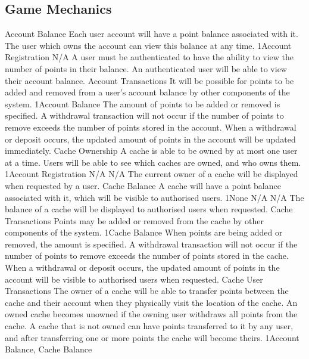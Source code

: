 	\subsection{Game Mechanics}
		\funcreq
			{Account Balance}
			{Each user account will have a point balance associated with it. 
			The user which owns the account can view this balance at any time.}
			{1}{Account Registration}
			{N/A}
			{A user must be authenticated to have the ability to view the 
			number of points in their balance.}
			{An authenticated user will be able to view their account balance.}
		\funcreq
			{Account Transactions}
			{It will be possible for points to be added and removed from a 
			user's account balance by other components of the system.}
			{1}{Account Balance}
			{The amount of points to be added or removed is specified.}
			{A withdrawal transaction will not occur if the number of points 
			to remove exceeds the number of points stored in the account.}
			{When a withdrawal or deposit occurs, the updated amount of points 
			in the account will be updated immediately.}
		\funcreq
			{Cache Ownership}
			{A cache is able to be owned by at most one user at a time. Users 
			will be able to see which caches are owned, and who owns them.}
			{1}{Account Registration}
			{N/A}
			{N/A}
			{The current owner of a cache will be displayed when requested by 
			a user.}
		\funcreq
			{Cache Balance}
			{A cache will have a point balance associated with it, which will 
			be visible to authorised users.}
			{1}{None}
			{N/A}
			{N/A}
			{The balance of a cache will be displayed to authorised users when 
			requested.}
		\funcreq
			{Cache Transactions}
			{Points may be added or removed from the cache by other components 
			of the system.}
			{1}{Cache Balance}
			{When points are being added or removed, the amount is specified.}
			{A withdrawal transaction will not occur if the number of points 
			to remove exceeds the number of points stored in the cache.}
			{When a withdrawal or deposit occurs, the updated amount of points 
			in the account will be visible to authorised users when requested.}
		\funcreq
			{Cache User Transactions}
			{The owner of a cache will be able to transfer points between the 
			cache and their account when they physically visit the location of 
			the cache. An owned cache becomes unowned if the owning user 
			withdraws all points from the cache. A cache that is not owned can 
			have points transferred to it by any user, and after transferring 
			one or more points the cache will become theirs.}
			{1}{Account Balance, Cache Balance}
